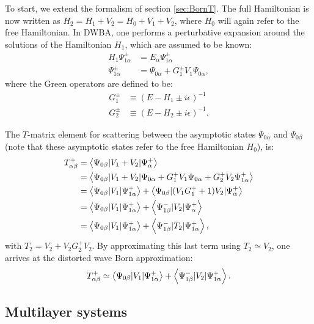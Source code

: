 To start, we extend the formalism of section \ref{sec:BornT}.
The full Hamiltonian is now written as $H_2 = H_1 + V_2 = H_0 +V_1 + V_2$,
where $H_0$ will again refer to the free Hamiltonian.
In DWBA,
one performs a perturbative expansion
around the solutions of the Hamiltonian $H_1$,
which are assumed to be known:
\begin{align*}
  H_1\Psi^\pm_{1\alpha} &= E_\alpha\Psi^\pm_{1\alpha} \\
  \Psi^\pm_{1\alpha} &= \Psi_{0\alpha} + G^\pm_1 V_1 \Psi_{0\alpha},
\end{align*}
where the Green operators are defined to be:
\begin{align*}
  G^\pm_1 &\equiv (E-H_1\pm i\epsilon) ^{-1} \nonumber \\
  G^\pm_2 &\equiv (E-H_2\pm i\epsilon) ^{-1}.
\end{align*}

The $T$-matrix element for scattering between the asymptotic states $\Psi_{0\alpha}$ and $\Psi_{0\beta}$ (note that these asymptotic states refer to the free Hamiltonian $H_0$), is:
\begin{align*}
  T^+_{\alpha\beta} &= \left\langle \Psi_{0\beta} \vert V_1+V_2 \vert \Psi^+_\alpha \right\rangle \nonumber \\
  & = \left\langle \Psi_{0\beta} \vert V_1+V_2 \vert \Psi_{0\alpha} + G^+_1V_1\Psi_{0\alpha} + G^+_2V_2\Psi^+_{1\alpha} \right\rangle \nonumber \\
  & = \left\langle \Psi_{0\beta} \vert V_1 \vert \Psi^+_{1\alpha} \right\rangle + \left\langle \Psi_{0\beta} \vert (V_1G^+_1 + 1)V_2 \vert \Psi^+_\alpha \right\rangle \\
  & = \left\langle \Psi_{0\beta} \vert V_1 \vert \Psi^+_{1\alpha} \right\rangle + \left\langle \Psi^-_{1\beta} \vert V_2 \vert \Psi^+_\alpha \right\rangle \nonumber \\
  & = \left\langle \Psi_{0\beta} \vert V_1 \vert \Psi^+_{1\alpha} \right\rangle + \left\langle \Psi^-_{1\beta} \vert T_2 \vert \Psi^+_{1\alpha} \right\rangle,
\end{align*}
with $T_2 = V_2 + V_2G^+_2V_2$. By approximating this last term using $T_2 \simeq V_2$, one arrives at the distorted wave Born approximation:
\begin{equation}
  \label{eq:tdwba}
   T^+_{\alpha\beta} \simeq \left\langle \Psi_{0\beta} \vert V_1 \vert \Psi^+_{1\alpha} \right\rangle + \left\langle \Psi^-_{1\beta} \vert V_2 \vert \Psi^+_{1\alpha} \right\rangle.
\end{equation}


\subsection{Multilayer systems}

